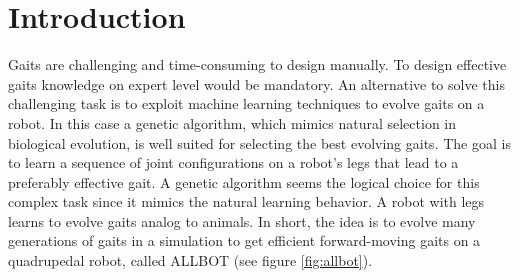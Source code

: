 \graphicspath{{figures/}}


                       
\chapter{Introduction}

Gaits are challenging and time-consuming to design manually.
To design effective gaits knowledge on expert level would be mandatory.
An alternative to solve this challenging task is to exploit machine learning techniques to evolve gaits on a robot.
In this case a genetic algorithm, which mimics natural selection in biological evolution, is well suited for selecting the best evolving gaits.
The goal is to learn a sequence of joint configurations on a robot's legs that lead to a preferably effective gait.
A genetic algorithm seems the logical choice for this complex task since it mimics the natural learning behavior.
A robot with legs learns to evolve gaits analog to animals.
In short, the idea is to evolve many generations of gaits in a simulation to get efficient forward-moving gaits on a quadrupedal robot, called ALLBOT (see figure \ref{fig:allbot}).

